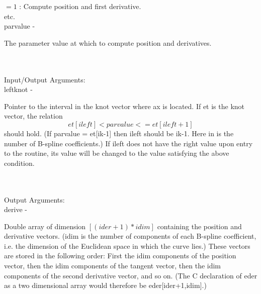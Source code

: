 		    \>\>\>\>\>          $ = 1$ : Compute position and first derivative.\\
		    \>\>\>\>\>          etc. \\
        \>\>    {\fov parvalue}\> - \>  \begin{minipg2}
                     The parameter value at which to compute
                       position and derivatives.
                               \end{minipg2}\\
\\
	\>Input/Output Arguments:\\
        \>\>    {\fov leftknot}\> - \>  \begin{minipg2}
                     Pointer to the interval in the knot vector
                        where ax is located. If et is the knot vector,
                        the relation
                          $$et[ileft] < parvalue <= et[ileft+1]$$
                        should hold. (If parvalue = et[ik-1] then ileft
                        should be ik-1. Here in is the number of B-spline
                        coefficients.)
                        If ileft does not have the right value upon
                        entry to the routine, its value will be changed
                        to the value satisfying the above condition.
                               \end{minipg2}\\
\\
	\>Output Arguments:\\
        \>\>    {\fov derive}\> - \>  \begin{minipg2}
                     Double array of dimension $[(ider+1)*idim]$
                       containing the position and derivative vectors.
                       (idim is the number of components of each B-spline
                       coefficient, i.e. the dimension of the Euclidean
                       space in which the curve lies.)
                       These vectors are stored in the following order:
                       First the idim components of the position vector,
                       then the idim components of the tangent vector,
                       then the idim components of the second derivative
                       vector, and so on.
                       (The C declaration of eder as a two dimensional array
                       would therefore be eder[ider+1,idim].)
                               \end{minipg2}\\
